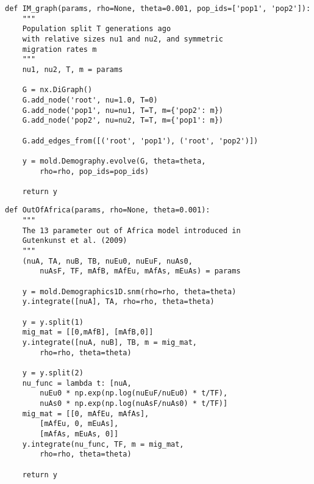 \documentclass[10pt]{article}
\renewcommand{\cite}{\citep}
\begin{document}
\begin{lstlisting}[caption={\textbf{IM model using Demography:} The same isolation with migration model, defined using the graphical representation of the Demography method.}, float, label={lst:IM_demo}]
def IM_graph(params, rho=None, theta=0.001, pop_ids=['pop1', 'pop2']):
    """
    Population split T generations ago
    with relative sizes nu1 and nu2, and symmetric
    migration rates m
    """
    nu1, nu2, T, m = params
    
    G = nx.DiGraph()
    G.add_node('root', nu=1.0, T=0)
    G.add_node('pop1', nu=nu1, T=T, m={'pop2': m})
    G.add_node('pop2', nu=nu2, T=T, m={'pop1': m})

    G.add_edges_from([('root', 'pop1'), ('root', 'pop2')])
    
    y = mold.Demography.evolve(G, theta=theta, 
        rho=rho, pop_ids=pop_ids)
    
    return y
\end{lstlisting}


\begin{lstlisting}[caption={\textbf{Out of Africa model:} The Gutenkunst Out-of-Africa model \cite{Gutenkunst2009}, with 13 parameters as originally defined. This model has three representative continental populations (often YRI, CEU, and CHB), with an out of Africa split between Eurasian and African populations, followed by a split between European and East Asian populations, with symmetric migration rates and size changes along each branch.}, float, label={lst:ooa}]
def OutOfAfrica(params, rho=None, theta=0.001):
    """
    The 13 parameter out of Africa model introduced in
    Gutenkunst et al. (2009)
    """
    (nuA, TA, nuB, TB, nuEu0, nuEuF, nuAs0, 
        nuAsF, TF, mAfB, mAfEu, mAfAs, mEuAs) = params
    
    y = mold.Demographics1D.snm(rho=rho, theta=theta)
    y.integrate([nuA], TA, rho=rho, theta=theta)
    
    y = y.split(1)
    mig_mat = [[0,mAfB], [mAfB,0]]
    y.integrate([nuA, nuB], TB, m = mig_mat,
        rho=rho, theta=theta)
        
    y = y.split(2)
    nu_func = lambda t: [nuA,
        nuEu0 * np.exp(np.log(nuEuF/nuEu0) * t/TF),
        nuAs0 * np.exp(np.log(nuAsF/nuAs0) * t/TF)]
    mig_mat = [[0, mAfEu, mAfAs],
        [mAfEu, 0, mEuAs],
        [mAfAs, mEuAs, 0]]
    y.integrate(nu_func, TF, m = mig_mat, 
        rho=rho, theta=theta)
        
    return y
\end{lstlisting}
\end{document}
